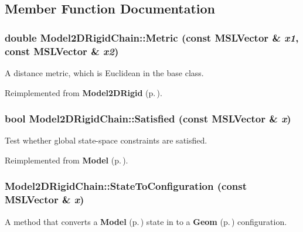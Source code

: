 \subsection{Member Function Documentation}
\subsubsection{\setlength{\rightskip}{0pt plus 5cm}double Model2DRigid\-Chain::Metric (const {\bf MSLVector} \& {\em x1}, const {\bf MSLVector} \& {\em x2})\hspace{0.3cm}{\tt  [virtual]}}\label{classModel2DRigidChain_a4}


A distance metric, which is Euclidean in the base class.



Reimplemented from {\bf Model2DRigid} {\rm (p.\,\pageref{classModel2DRigid_a6})}.
\subsubsection{\setlength{\rightskip}{0pt plus 5cm}bool Model2DRigid\-Chain::Satisfied (const {\bf MSLVector} \& {\em x})\hspace{0.3cm}{\tt  [virtual]}}\label{classModel2DRigidChain_a5}


Test whether global state-space constraints are satisfied.



Reimplemented from {\bf Model} {\rm (p.\,\pageref{classModel_a4})}.
\subsubsection{ Model2DRigid\-Chain::State\-To\-Configuration (const {\bf MSLVector} \& {\em x})\hspace{0.3cm}{\tt  [virtual]}}\label{classModel2DRigidChain_a2}


A method that converts a {\bf Model} {\rm (p.\,\pageref{classModel})} state in to a {\bf Geom} {\rm (p.\,\pageref{classGeom})} configuration.



